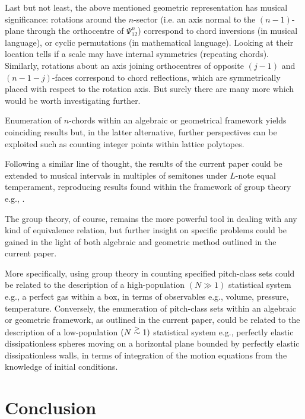\documentclass[12pt,a4paper]{article}
\begin{document}
Last but not least, the above mentioned geometric
representation has musical significance: rotations around the $n$-sector (i.e.
an axis normal to the $(n-1)$-plane through the orthocentre of $\Psi_{12}^n$)
correspond to chord inversions (in musical
language), or cyclic permutations (in mathematical language). Looking at their
location tells if a scale may have internal symmetries (repeating chords).
Similarly, rotations about an axis joining orthocentres of opposite $(j-1)$
and $(n-1-j)$-faces correspond to chord reflections, which are symmetrically
placed with respect to the rotation axis.
But surely there are many more which would be worth investigating further.

Enumeration of $n$-chords within an algebraic or geometrical framework yields
coinciding results but, in the latter alternative, further perspectives can be
exploited such as counting integer points within lattice polytopes.

Following a similar line of thought, the results of the current paper could be
extended to musical intervals in multiples of semitones under
$L$-note equal temperament, reproducing
results found within the framework of group theory e.g., \cite{Fri99}
\cite{Hoo07}.

The
group theory, of course, remains the more powerful tool in dealing with any
kind of equivalence relation, but further insight on specific problems could
be gained in the light of both algebraic and geometric method outlined in the
current paper.

More specifically, using group theory in counting specified pitch-class sets
could be
related to the description of a high-population $(N\gg1)$ statistical system
e.g., a perfect gas within a box, in terms of observables e.g., volume,
pressure, temperature.   Conversely, the enumeration of pitch-class sets
within an algebraic or geometric framework, as outlined in the current paper,
could be related to the description of a low-population $(N\stackrel{>}{\sim}1)$
statistical system e.g., perfectly elastic dissipationless spheres moving on a
horizontal plane bounded by perfectly elastic dissipationless walls, in terms
of integration of the motion equations from the knowledge of initial
conditions.

\section{Conclusion}\label{conc}
\end{document}
